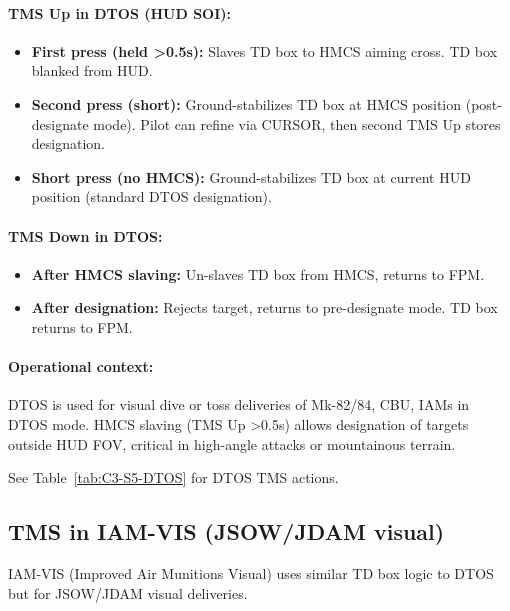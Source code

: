 \documentclass[11pt, a4paper, twoside]{report}
\begin{document}
\paragraph{TMS Up in DTOS (HUD SOI):}
\begin{itemize}
    \item \textbf{First press (held >0.5s):} Slaves TD box to HMCS aiming cross. TD box blanked from HUD.
    \item \textbf{Second press (short):} Ground-stabilizes TD box at HMCS position (post-designate mode). Pilot can refine via CURSOR, then second TMS Up stores designation.
    \item \textbf{Short press (no HMCS):} Ground-stabilizes TD box at current HUD position (standard DTOS designation).
\end{itemize}

\paragraph{TMS Down in DTOS:}
\begin{itemize}
    \item \textbf{After HMCS slaving:} Un-slaves TD box from HMCS, returns to FPM.
    \item \textbf{After designation:} Rejects target, returns to pre-designate mode. TD box returns to FPM.
\end{itemize}

\paragraph{Operational context:}
DTOS is used for visual dive or toss deliveries of Mk-82/84, CBU, IAMs in DTOS mode. HMCS slaving (TMS Up >0.5s) allows designation of targets outside HUD FOV, critical in high-angle attacks or mountainous terrain.

See Table~\ref{tab:C3-S5-DTOS} for DTOS TMS actions.

\subsection{TMS in IAM-VIS (JSOW/JDAM visual)}
\label{sec:C3-S5-S3}

IAM-VIS (Improved Air Munitions Visual) uses similar TD box logic to DTOS but for JSOW/JDAM visual deliveries.
\end{document}
